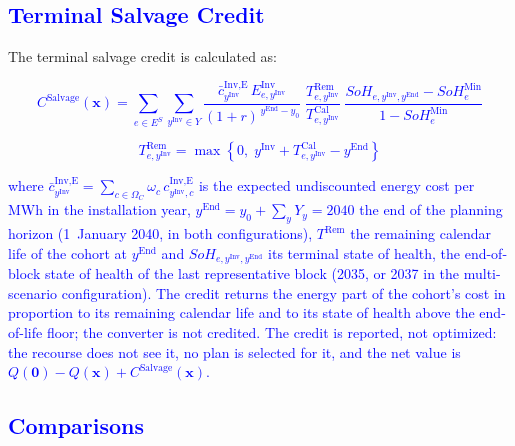 \documentclass[preprint,12pt]{elsarticle}
\begin{document}
\subsection{\textcolor{blue}{Terminal Salvage Credit}}
\label{app:salvage_credit}

The terminal salvage credit is calculated as:


\textcolor{blue}{
    \begin{equation}
        C^\text{Salvage}(\boldsymbol{x}) =
        \sum_{e \in E^S} \sum_{y^\text{Inv} \in Y}
        \frac{\bar{c}^{\text{Inv,E}}_{y^\text{Inv}}\, E^{\text{Inv}}_{e,y^\text{Inv}}}{(1+r)^{\,y^\text{End}-y_0}}
        \;\frac{T^\text{Rem}_{e,y^\text{Inv}}}{T^\text{Cal}_{e,y^\text{Inv}}}
        \;\frac{SoH_{e,y^\text{Inv},y^\text{End}} - SoH^{\text{Min}}_e}{1 - SoH^{\text{Min}}_e}
        \label{eq:salvage_credit}
    \end{equation}
}

\textcolor{blue}{
    \begin{equation}
        T^\text{Rem}_{e,y^\text{Inv}} = \max\left\{0,\; y^\text{Inv} + T^\text{Cal}_{e,y^\text{Inv}} - y^\text{End}\right\}
        \label{eq:salvage_remaining_life}
    \end{equation}
}

\noindent
\textcolor{blue}{
    where $\bar{c}^{\text{Inv,E}}_{y^\text{Inv}} = \sum_{c \in \Omega_C} \omega_c\, c^{\text{Inv,E}}_{y^\text{Inv},c}$ is the expected undiscounted energy cost per MWh in the installation year, $y^\text{End} = y_0 + \sum_{y} Y_y = 2040$ the end of the planning horizon (1~January 2040, in both configurations), $T^\text{Rem}$ the remaining calendar life of the cohort at $y^\text{End}$ and $SoH_{e,y^\text{Inv},y^\text{End}}$ its terminal state of health, the end-of-block state of health of the last representative block (2035, or 2037 in the multi-scenario configuration). The credit returns the energy part of the cohort's cost in proportion to its remaining calendar life and to its state of health above the end-of-life floor; the converter is not credited. 
    The credit is reported, not optimized: the recourse does not see it, no plan is selected for it, and the net value is $Q(\boldsymbol{0}) - Q(\boldsymbol{x}) + C^\text{Salvage}(\boldsymbol{x})$.
}

\subsection{\textcolor{blue}{Comparisons}}
\label{app:results_claims}
\end{document}
